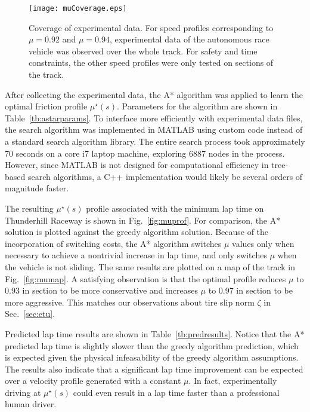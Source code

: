 {{{ \begin{figure}[tb]
\centering
\texttt{[image: muCoverage.eps]}
\caption[Coverage of experimental data]{Coverage of experimental data. For speed profiles corresponding to $\mu = 0.92$ and $\mu = 0.94$, experimental data of the autonomous race vehicle was observed
over the whole track. For safety and time constraints, the other speed profiles were only tested on sections of the track.}
\label{fig:muCoverage}
\end{figure} 

After collecting the experimental data, the A* algorithm was applied to learn the optimal friction profile $\mu^\star(s)$. Parameters for the algorithm
are shown in Table~\ref{tb:astarparams}. To interface more efficiently with experimental data files, the search algorithm was implemented in MATLAB using
custom code instead of a standard search algorithm library. The entire search process took approximately 70 seconds on a core i7 laptop machine,
exploring 6887 nodes in the process. However, since MATLAB is not designed for computational efficiency in tree-based search algorithms, a C++ implementation would likely
be several orders of magnitude faster. 

 The resulting $\mu^\star(s)$ profile associated with the minimum lap time on Thunderhill Raceway is shown in Fig.~\ref{fig:muprof}. For
 comparison, the A* solution is plotted against the greedy algorithm solution. Because of the incorporation of switching costs,
 the A* algorithm switches $\mu$ values only when necessary to achieve a nontrivial increase in lap time, and only switches $\mu$ when
 the vehicle is not sliding. The same results are plotted on a map of the track in Fig.~\ref{fig:mumap}. A satisfying observation is that the optimal profile reduces $\mu$ to 0.93 in section  to be
more conservative and increases $\mu$ to 0.97 in section  to be more aggressive. This matches our observations about tire slip norm $\zeta$ in 
 Sec.~\ref{sec:etu}. 
 
 \newpage
 Predicted lap time results are shown in Table~\ref{tb:predresults}. Notice that the A* predicted lap time is slightly
 slower than the greedy algorithm prediction, which is expected given the physical infeasability of the greedy algorithm assumptions. The
 results also indicate that a significant lap time improvement can be expected over a velocity profile generated with a constant $\mu$. In fact,
 experimentally driving at $\mu^\star(s)$ could even result in a lap time faster than a professional human driver.
 
}}}

